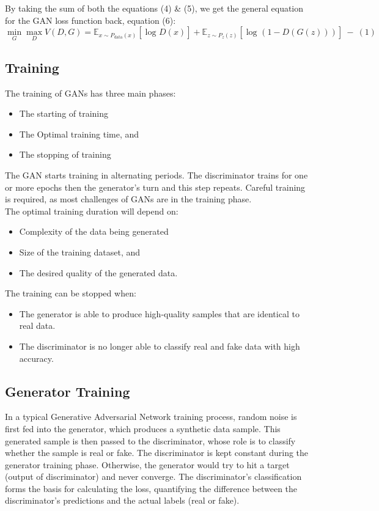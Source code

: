 \noindent
By taking the sum of both the equations (4) \& (5), we get the general equation for the GAN loss function back, equation (6):
\[
\min_G \max_D V(D,G) = \mathbb{E}_{x\sim P_{\text{data}}(x)}\left[\log_{}D(x)\right] + \mathbb{E}_{z\sim P_z(z)}\left[\log_{}(1-D(G(z)))\right]~-~(1)
\]

\clearpage

\subsection{Training}

\noindent
The training of GANs has three main phases:
\begin{itemize}
    \item The starting of training
    \item The Optimal training time, and
    \item The stopping of training
\end{itemize}

\noindent
The GAN starts training in alternating periods. The discriminator trains for one or more epochs then the generator’s turn and this step repeats. Careful training is required, as most challenges of GANs are in the training phase.\\

\noindent
The optimal training duration will depend on: 
\begin{itemize}
    \item Complexity of the data being generated
    \item Size of the training dataset, and
    \item The desired quality of the generated data.
\end{itemize}

\noindent
The training can be stopped when:
\begin{itemize}
    \item The generator is able to produce high-quality samples that are identical to real data.
    \item The discriminator is no longer able to classify real and fake data with high accuracy.
\end{itemize}

\subsection{Generator Training}

\noindent
In a typical Generative Adversarial Network training process, random noise is first fed into the generator, which produces a synthetic data sample. This generated sample is then passed to the discriminator, whose role is to classify whether the sample is real or fake. The discriminator is kept constant during the generator training phase. Otherwise, the generator would try to hit a target (output of discriminator) and never converge. The discriminator's classification forms the basis for calculating the loss, quantifying the difference between the discriminator's predictions and the actual labels (real or fake). 

